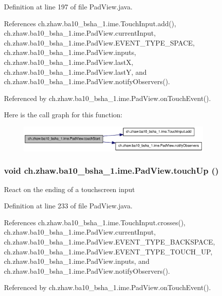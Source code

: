 Definition at line 197 of file PadView.java.

References ch.zhaw.ba10\_\-bsha\_\-1.ime.TouchInput.add(), ch.zhaw.ba10\_\-bsha\_\-1.ime.PadView.currentInput, ch.zhaw.ba10\_\-bsha\_\-1.ime.PadView.EVENT\_\-TYPE\_\-SPACE, ch.zhaw.ba10\_\-bsha\_\-1.ime.PadView.inputs, ch.zhaw.ba10\_\-bsha\_\-1.ime.PadView.lastX, ch.zhaw.ba10\_\-bsha\_\-1.ime.PadView.lastY, and ch.zhaw.ba10\_\-bsha\_\-1.ime.PadView.notifyObservers().

Referenced by ch.zhaw.ba10\_\-bsha\_\-1.ime.PadView.onTouchEvent().

Here is the call graph for this function:\nopagebreak
\begin{figure}[H]
\begin{center}
\leavevmode
\includegraphics[width=272pt]{classch_1_1zhaw_1_1ba10__bsha__1_1_1ime_1_1PadView_aa6c73f1271801bab9f52b52e53ca9c06_cgraph}
\end{center}
\end{figure}
\hypertarget{classch_1_1zhaw_1_1ba10__bsha__1_1_1ime_1_1PadView_ac4eee83441a5d6f625582acf5a1d7d03}{
\subsubsection[{touchUp}]{\setlength{\rightskip}{0pt plus 5cm}void ch.zhaw.ba10\_\-bsha\_\-1.ime.PadView.touchUp ()}}
\label{classch_1_1zhaw_1_1ba10__bsha__1_1_1ime_1_1PadView_ac4eee83441a5d6f625582acf5a1d7d03}
React on the ending of a touchscreen input 

Definition at line 233 of file PadView.java.

References ch.zhaw.ba10\_\-bsha\_\-1.ime.TouchInput.crosses(), ch.zhaw.ba10\_\-bsha\_\-1.ime.PadView.currentInput, ch.zhaw.ba10\_\-bsha\_\-1.ime.PadView.EVENT\_\-TYPE\_\-BACKSPACE, ch.zhaw.ba10\_\-bsha\_\-1.ime.PadView.EVENT\_\-TYPE\_\-TOUCH\_\-UP, ch.zhaw.ba10\_\-bsha\_\-1.ime.PadView.inputs, and ch.zhaw.ba10\_\-bsha\_\-1.ime.PadView.notifyObservers().

Referenced by ch.zhaw.ba10\_\-bsha\_\-1.ime.PadView.onTouchEvent().

